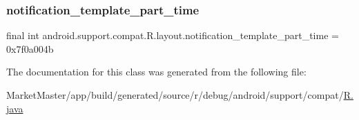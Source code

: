 \subsubsection{\texorpdfstring{notification\+\_\+template\+\_\+part\+\_\+time}{notification\_template\_part\_time}}
{\footnotesize\ttfamily final int android.\+support.\+compat.\+R.\+layout.\+notification\+\_\+template\+\_\+part\+\_\+time = 0x7f0a004b\hspace{0.3cm}{\ttfamily [static]}}



The documentation for this class was generated from the following file\+:\begin{DoxyCompactItemize}
\item 
Market\+Master/app/build/generated/source/r/debug/android/support/compat/\mbox{\hyperlink{debug_2android_2support_2compat_2R_8java}{R.\+java}}\end{DoxyCompactItemize}
